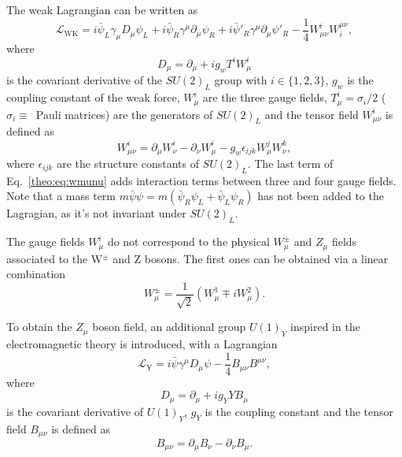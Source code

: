 \documentclass[../main.tex]{subfiles}
\begin{document}
The weak Lagrangian can be written as
\begin{equation}
\mathcal{L}_{\text{WK}} = i\bar{\psi}_L\gamma_\mu D_\mu \psi_L + i \bar{\psi}_R\gamma^\mu\partial_\mu\psi_R + i \bar{\psi}'_R\gamma^\mu\partial_\mu\psi'_R - \frac{1}{4}W_{\mu\nu}^i W_i^{\mu\nu},
\end{equation}
where
\begin{equation}
D_\mu = \partial_\mu + ig_w T^i W_\mu^i
\end{equation}
is the covariant derivative of the $SU(2)_L$ group with $i\in\{1, 2, 3\}$, $g_w$ is the coupling constant of the weak force, $W_\mu^i$ are the three gauge fields, $T_\mu^i = \sigma_i / 2$ ($\sigma_i\equiv$~Pauli matrices) are the generators of $SU(2)_L$ and the tensor field $W_{\mu\nu}^i$ is defined as
\begin{equation}
\label{theo:eq:wmunu}
W_{\mu\nu}^i = \partial_\mu W_\nu^i - \partial_\nu W_\mu^i - g_w \epsilon_{ijk}W_\mu^j W_\nu^k,
\end{equation}
where $\epsilon_{ijk}$ are the structure constants of $SU(2)_L$. The last term of Eq.~\eqref{theo:eq:wmunu} adds interaction terms between three and four gauge fields. Note that a mass term $m\bar{\psi}\psi = m(\bar{\psi}_R\psi_L + \bar{\psi}_L \psi_R)$ has not been added to the Lagragian, as it's not invariant under $SU(2)_L$.

The gauge fields $W_\mu^i$ do not correspond to the physical $W_\mu^\pm$ and $Z_\mu$ fields associated to the W${}^\pm$ and Z bosons. The first ones can be obtained via a linear combination
\begin{equation}
\label{theo:eq:w}
W_\mu^\pm = \frac{1}{\sqrt{2}}(W_\mu^1 \mp i W_\mu^2).
\end{equation}

To obtain the $Z_\mu$ boson field, an additional group $U(1)_Y$ inspired in the electromagnetic theory is introduced, with a Lagrangian
\begin{equation}
\mathcal{L}_\text{Y} = i\bar{\psi}\gamma^\mu D_\mu \psi - \frac{1}{4}B_{\mu\nu}B^{\mu\nu},
\end{equation}
where
\begin{equation}
D_\mu = \partial_\mu + ig_Y Y B_\mu
\end{equation}
is the covariant derivative of $U(1)_Y$, $g_Y$ is the coupling constant and the tensor field $B_{\mu\nu}$ is defined as
\begin{equation}
B_{\mu\nu} = \partial_\mu B_\nu - \partial_\nu B_\mu.
\end{equation}
\end{document}
